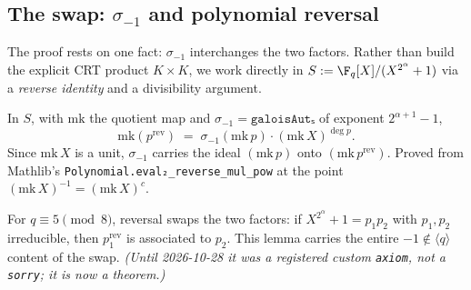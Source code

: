 \subsection{The swap: \texorpdfstring{$\sigma_{-1}$}{σ(-1)} and polynomial reversal}

The proof rests on one fact: $\sigma_{-1}$ interchanges the two factors. Rather than build the
explicit CRT product $K \times K$, we work directly in $S := \F_q[X]/(X^{2^\alpha}+1)$ via a
\emph{reverse identity} and a divisibility argument.

\begin{lemma}\label{lem:conj_reverse}
\leanok
In $S$, with $\mathrm{mk}$ the quotient map and $\sigma_{-1} = \texttt{galoisAutₛ}$ of exponent
$2^{\alpha+1}-1$,
\[
  \mathrm{mk}(p^{\mathrm{rev}}) \;=\; \sigma_{-1}(\mathrm{mk}\,p)\cdot(\mathrm{mk}\,X)^{\deg p}.
\]
Since $\mathrm{mk}\,X$ is a unit, $\sigma_{-1}$ carries the ideal $(\mathrm{mk}\,p)$ onto
$(\mathrm{mk}\,p^{\mathrm{rev}})$. Proved from Mathlib's
\texttt{Polynomial.eval₂\_reverse\_mul\_pow} at the point $(\mathrm{mk}\,X)^{-1} = (\mathrm{mk}\,X)^{c}$.
\end{lemma}

\begin{lemma}\label{lem:no_selfReciprocal}
\leanok
{}
For $q \equiv 5 \pmod 8$, reversal swaps the two factors: if $X^{2^\alpha}+1 = p_1 p_2$ with
$p_1, p_2$ irreducible, then $p_1^{\mathrm{rev}}$ is associated to $p_2$. This lemma carries the
entire $-1 \notin \langle q\rangle$ content of the swap. \emph{(Until 2026-10-28 it was a
registered custom \texttt{axiom}, not a \texttt{sorry}; it is now a theorem.)}
\end{lemma}

